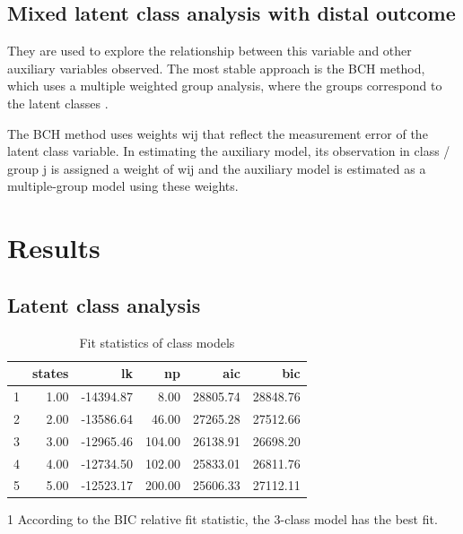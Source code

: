 \subsection{Mixed latent class analysis with distal outcome}

They are used to explore the relationship between this variable and other auxiliary variables observed. The most stable approach is the BCH method, which uses a multiple weighted group analysis, where the groups correspond to the latent classes \parencite{bakk_relating_2014}.
\bigskip

The BCH method uses weights wij that reflect the measurement error of the latent class variable. In estimating the auxiliary model, its observation in class / group j is assigned a weight of wij and the auxiliary model is estimated as a multiple-group model using these weights. 

\section{Results}

\subsection{Latent class analysis}

\begin{table}[H]
\centering
\begin{threeparttable}
\caption{\label{demo-table} Fit statistics of class models}
\begin{tabular}{rrrrrr}
  \hline
 & states & lk & np & aic & bic \\ 
  \hline
1 & 1.00 & -14394.87 & 8.00 & 28805.74 & 28848.76 \\ 
  2 & 2.00 & -13586.64 & 46.00 & 27265.28 & 27512.66 \\ 
  3 & 3.00 & -12965.46 & 104.00 & 26138.91 & 26698.20 \\ 
  4 & 4.00 & -12734.50 & 102.00 & 25833.01 & 26811.76 \\ 
  5 & 5.00 & -12523.17 & 200.00 & 25606.33 & 27112.11 \\ 
   \hline
\end{tabular}
\begin{tablenotes}
    \item[1] According to the BIC relative fit statistic, the 3-class model has the best fit.
  \end{tablenotes}
\end{threeparttable}
\end{table}


